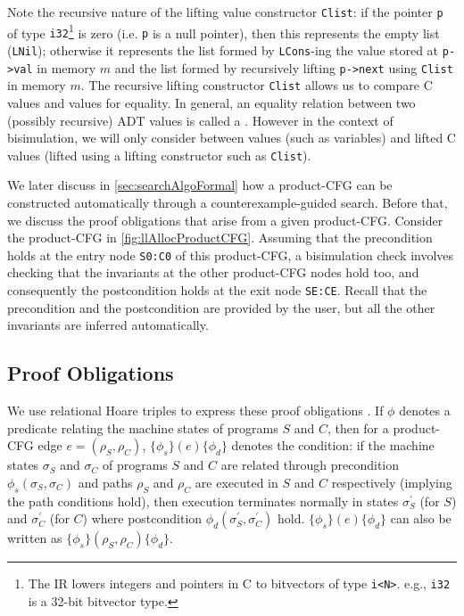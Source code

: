 Note the recursive nature of the lifting value constructor {\tt Clist}: if the pointer {\tt p} of type {\tt i32}\footnote{The IR lowers integers and pointers in C to bitvectors of type {\tt i<N>}. e.g., {\tt i32} is a 32-bit bitvector type.}
is zero (i.e. {\tt p} is a null pointer), then this represents the empty list ({\tt LNil}); otherwise it represents the list formed by {\tt LCons}-ing
the value stored at {\tt p->val} in memory $m$ and the list formed by recursively lifting {\tt p->next} using
{\tt Clist} in memory $m$.  The recursive lifting
constructor {\tt Clist} allows us to compare C values and \SpecL{} values for equality.
In general, an equality relation between two (possibly recursive) ADT values is called a {\em \recursiveRelation{}}.
However in the context of bisimulation,
we will only consider \recursiveRelations{} between \SpecL{} values (such as variables) and
lifted C values (lifted using a lifting constructor such as {\tt Clist}).

We later discuss in \cref{sec:searchAlgoFormal}
how a product-CFG can be constructed automatically through a counterexample-guided
search. Before that, we discuss the proof obligations that arise from a given
product-CFG. Consider the
product-CFG in \cref{fig:llAllocProductCFG}. Assuming that the precondition  holds at the entry node
{\tt S0:C0} of this product-CFG, a bisimulation
check involves checking that the invariants at the other
product-CFG nodes hold too, and consequently the postcondition 
holds at the exit node {\tt SE:CE}.
Recall that the precondition  and the postcondition 
are provided by the user, but all the other invariants are inferred automatically.

\subsection{Proof Obligations}
\label{sec:proofObligations}
We use relational Hoare triples to express these proof obligations \cite{relationalHoareLogic,hoareTriple}.
If $\phi$ denotes a predicate relating the machine states
of programs $S$ and $C$, then for a product-CFG edge $e=(\rho_S,\rho_C)$,
$\{\phi_s\} (e) \{\phi_d\}$ denotes the condition:
if the machine states $\sigma_S$ and $\sigma_C$ of programs $S$
and $C$ are related through precondition $\phi_s(\sigma_S,\sigma_C)$ and
paths $\rho_S$ and $\rho_C$ are executed in $S$
and $C$ respectively (implying the path conditions
hold), then execution terminates normally in states $\sigma_S^{'}$ (for $S$)
and $\sigma_C^{'}$ (for $C$) where
postcondition $\phi_d(\sigma_S^{'}, \sigma_C^{'})$ hold.
$\{\phi_s\} (e) \{\phi_d\}$ can also be written as
$\{\phi_s\} (\rho_S,\rho_C) \{\phi_d\}$.

